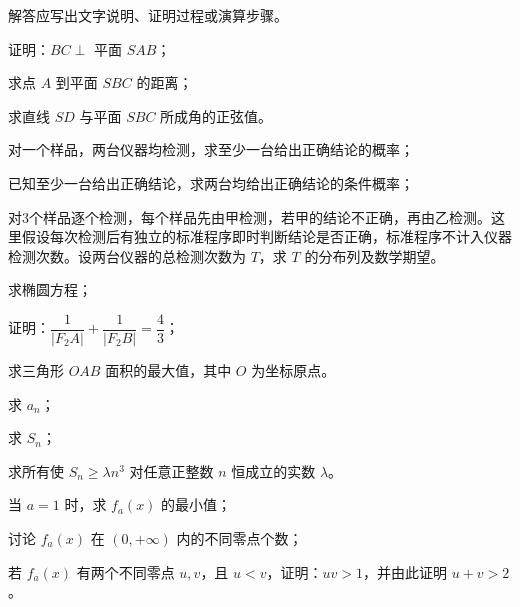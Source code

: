 \clearpage
{}
解答应写出文字说明、证明过程或演算步骤。
\begin{center}
\end{center}
\begin{Subquestions}
\item 证明：$BC\perp$ 平面 $SAB$；
\item 求点 $A$ 到平面 $SBC$ 的距离；
\item 求直线 $SD$ 与平面 $SBC$ 所成角的正弦值。
\end{Subquestions}
\begin{Subquestions}
\item 对一个样品，两台仪器均检测，求至少一台给出正确结论的概率；
\item 已知至少一台给出正确结论，求两台均给出正确结论的条件概率；
\item 对3个样品逐个检测，每个样品先由甲检测，若甲的结论不正确，再由乙检测。这里假设每次检测后有独立的标准程序即时判断结论是否正确，标准程序不计入仪器检测次数。设两台仪器的总检测次数为 $T$，求 $T$ 的分布列及数学期望。
\end{Subquestions}
\begin{Subquestions}
\item 求椭圆方程；
\item 证明：$\dfrac1{|F_2A|}+\dfrac1{|F_2B|}=\dfrac43$；
\item 求三角形 $OAB$ 面积的最大值，其中 $O$ 为坐标原点。
\end{Subquestions}

\begin{Subquestions}
\item 求 $a_n$；
\item 求 $S_n$；
\item 求所有使 $S_n\geq\lambda n^3$ 对任意正整数 $n$ 恒成立的实数 $\lambda$。
\end{Subquestions}

\clearpage
{}
\begin{Subquestions}
\item 当 $a=1$ 时，求 $f_a(x)$ 的最小值；
\item 讨论 $f_a(x)$ 在 $(0,+\infty)$ 内的不同零点个数；
\item 若 $f_a(x)$ 有两个不同零点 $u,v$，且 $u<v$，证明：$uv>1$，并由此证明 $u+v>2$。
\end{Subquestions}
